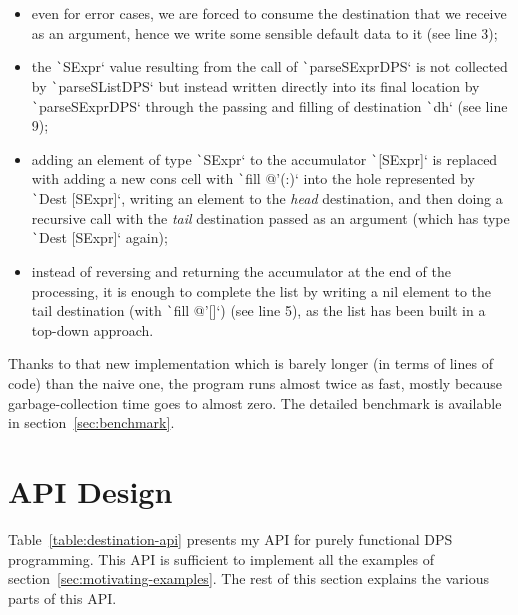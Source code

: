 \documentclass[english]{jflart}
\begin{document}
\begin{itemize}
  \item even for error cases, we are forced to consume the destination that we receive as an argument, hence we write some sensible default data to it (see line 3);
  \item the \texttt`SExpr` value resulting from the call of \texttt`parseSExprDPS` is not collected by \texttt`parseSListDPS` but instead written directly into its final location by \texttt`parseSExprDPS` through the passing and filling of destination \texttt`dh` (see line 9);
  \item adding an element of type \texttt`SExpr` to the accumulator \texttt`[SExpr]` is replaced with adding a new cons cell with \texttt`fill @'(:)` into the hole represented by \texttt`Dest [SExpr]`, writing an element to the \emph{head} destination, and then doing a recursive call with the \emph{tail} destination passed as an argument (which has type \texttt`Dest [SExpr]` again);
  \item instead of reversing and returning the accumulator at the end of the processing, it is enough to complete the list by writing a nil element to the tail destination (with \texttt`fill @'[]`) (see line 5), as the list has been built in a top-down approach.
\end{itemize}

Thanks to that new implementation which is barely longer (in terms of lines of code) than the naive one, the program runs almost twice as fast, mostly because garbage-collection time goes to almost zero. The detailed benchmark is available in section~\ref{sec:benchmark}.

\section{API Design}\label{sec:api}

Table~\ref{table:destination-api} presents my API for purely functional DPS programming. This API is sufficient to implement all the examples of section~\ref{sec:motivating-examples}. The rest of this section explains the various parts of this API.
\end{document}
